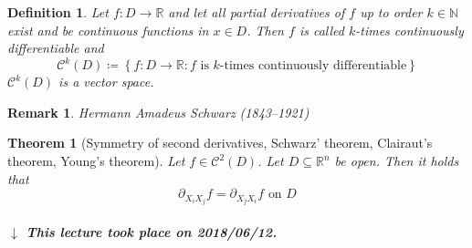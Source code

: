 \documentclass{article}
\newtheorem{theorem}{Theorem}  \numberwithin{theorem}{section}
\newtheorem{definition}{Definition}  \numberwithin{definition}{section}
\newtheorem{remark}{Remark}  \numberwithin{remark}{section}
\newcommand{\set}[1]{\left\{#1\right\}}
\newcommand{\dateref}[1]{%
  \begin{mdframed}[backgroundcolor=gray!10,innerbottommargin=0pt,innertopmargin=0pt]
    \paragraph{\textit{$\downarrow$ This lecture took place on #1.}}%
  \end{mdframed}%
}
\begin{document}
\begin{definition}
  Let $f: D \to \mathbb R$ and let all partial derivatives of $f$ up to order $k \in \mathbb N$ exist and be continuous functions in $x \in D$.
  Then $f$ is called \emph{$k$-times continuously differentiable} and
  \[ \mathcal C^k(D) \coloneqq \set{f: D \to \mathbb R: f \text{ is $k$-times continuously differentiable}} \]
  $\mathcal C^k(D)$ is a vector space.
\end{definition}

\begin{remark}
  Hermann Amadeus Schwarz (1843--1921)
\end{remark}

\begin{theorem}[Symmetry of second derivatives, Schwarz' theorem, Clairaut's theorem, Young's theorem] %
  Let $f \in \mathcal C^2(D)$. Let $D \subseteq \mathbb R^n$ be open. Then it holds that
  \[ \partial_{X_i X_j} f = \partial_{X_j X_i} f \text{ on } D \]
\end{theorem}

\dateref{2018/06/12}
\end{document}
